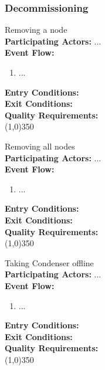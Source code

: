 \subsubsection{Decommissioning}		 
	Removing a node \\	 
	\textbf{Participating Actors:}  ... \\
	\textbf{Event Flow:}
	\begin{enumerate}
\item  ...
    \end{enumerate}
	\textbf{Entry Conditions:}\\
	\textbf{Exit Conditions:}\\
	\textbf{Quality Requirements:}\\
	\line(1,0){350}		

	Removing all nodes \\	 
	\textbf{Participating Actors:}  ... \\
	\textbf{Event Flow:}
	\begin{enumerate}
\item  ...
    \end{enumerate}
	\textbf{Entry Conditions:}\\
	\textbf{Exit Conditions:}\\
	\textbf{Quality Requirements:}\\
	\line(1,0){350}		

	Taking Condenser offline \\	 
	\textbf{Participating Actors:}  ... \\
	\textbf{Event Flow:}
	\begin{enumerate}
\item  ...
    \end{enumerate}
	\textbf{Entry Conditions:}\\
	\textbf{Exit Conditions:}\\
	\textbf{Quality Requirements:}\\
	\line(1,0){350}		